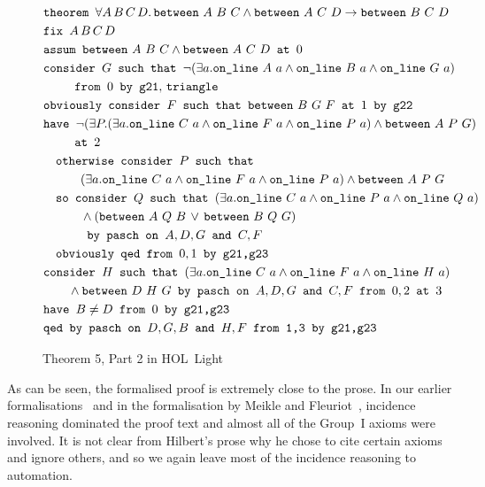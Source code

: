 \begin{figure}
\begin{align*}
&\texttt{theorem }\forall A\,B\,C\,D.\,\texttt{between}\ A\ B\ C\wedge \texttt{between}\ A\ C\ D\rightarrow\texttt{between}\ B\ C\ D\\
&\texttt{fix } A\,B\,C\,D\\
&\texttt{assum } \texttt{between}\ A\ B\ C\wedge \texttt{between}\ A\ C\ D\texttt{ at } 0\\
&\texttt{consider } G \texttt{ such that } \neg(\exists a.\texttt{on\_line}\ A\ a\wedge \texttt{on\_line}\ B\ a\wedge \texttt{on\_line}\ G\ a)\\
&\qquad\texttt{ from } 0 \texttt{ by } \texttt{g21},\,\texttt{triangle}\\
&\texttt{obviously consider } F \texttt{ such that } \texttt{between}\ B\ G\ F \texttt{ at } 1 \texttt{ by g22}\\
&\texttt{have } \neg(\exists P. (\exists a. \texttt{on\_line}\ C\ a\wedge \texttt{on\_line}\ F\ a\wedge \texttt{on\_line}\ P\ a)\wedge \texttt{between}\ A\ P\ G)\\
&\qquad\texttt{ at } 2\\
&\quad\texttt{otherwise consider } P \texttt{ such that }\\
&\quad\qquad(\exists a. \texttt{on\_line}\ C\ a\wedge \texttt{on\_line}\ F\ a\wedge \texttt{on\_line}\ P\ a)\wedge \texttt{between}\ A\ P\ G\\
&\quad\texttt{so consider } Q \texttt{ such that } (\exists a. \texttt{on\_line}\ C\ a\wedge \texttt{on\_line}\ P\ a\wedge \texttt{on\_line}\ Q\ a)\\
&\quad\qquad\wedge (\texttt{between}\ A\ Q\ B\,\vee\,\texttt{between}\ B\ Q\ G)\\
&\quad\qquad\texttt{ by pasch on } A,D,G \texttt{ and } C,F\\
&\quad\texttt{obviously qed from } 0,1 \texttt{ by g21,g23}\\
&\texttt{consider } H \texttt{ such that } (\exists a. \texttt{on\_line}\ C\ a\wedge \texttt{on\_line}\ F\ a\wedge \texttt{on\_line}\ H\ a)\\
&\qquad\wedge \texttt{between}\ D\ H\ G\texttt{ by pasch on } A,D,G \texttt{ and } C,F \texttt{ from } 0,2 \texttt{ at } 3\\
&\texttt{have } B \neq D \texttt{ from } 0 \texttt{ by g21,g23}\\
&\texttt{qed by pasch on } D,G,B \texttt{ and } H,F \texttt{ from 1,3 by g21,g23}
\end{align*}
\caption{Theorem 5, Part 2 in HOL~Light}
\label{fig:Theorem52Formalised}
\end{figure}

As can be seen, the formalised proof is extremely close to the prose. In our earlier formalisations~\cite{ScottMScThesis} and in the formalisation by Meikle and Fleuriot~\cite{MeikleFleuriotFormalizingHilbert}, incidence reasoning dominated the proof text and almost all of the Group~I axioms were involved. It is not clear from Hilbert's prose why he chose to cite certain axioms and ignore others, and so we again leave most of the incidence reasoning to automation.

